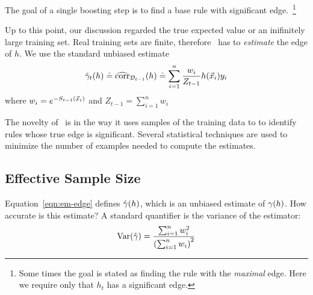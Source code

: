 The goal of a single boosting step is to find a base rule with
significant edge.~\footnote{Some times the goal is stated as
  finding the rule with the {\em maximal} edge.  Here we require only
  that $h_t$ has a significant edge.}

Up to this point, our discussion regarded the true expected value or
an inifinitely large training set. Real training sets are finite, 
therefore \Sparrow\ has to {\em
  estimate} the edge of $h$. We use the standard unbiased estimate
\begin{equation} \label{eqn:emp-edge}
\hat{\gamma}_{t}(h) \doteq \widehat{\mbox{corr}}_{{\cal D}_{t-1}}(h)
\doteq 
\sum_{i=1}^n \frac{w_i}{Z_{t-1}} h(\vec{x}_i) y_i
\end{equation}
where  $w_i = e^{-S_{t-1}(\vec{x}_i)}$ and $Z_{t-1} = \sum_{i=1}^n w_i$

The novelty of \Sparrow\ is in the way it uses samples of the training
data to to identify rules whose true edge is significant.
Several statistical techniques are used to minimize the number of
examples needed to compute the estimates.

\subsection{Effective Sample Size}
\label{sec:effectiveSampleSize}
Equation~\ref{eqn:em-edge} defines $\hat{\gamma}(h)$, which is an
unbiased estimate of $\gamma(h)$. How accurate is this estimate? A
standard quantifier is the variance of the estimator:
\begin{equation} \label{eqn:variance}
 \mbox{Var}(\hat{\gamma}) = \frac{\sum_{i=1}^n w_i^2}{\left(\sum_{i=1}^n w_i\right)^2}
\end{equation}


